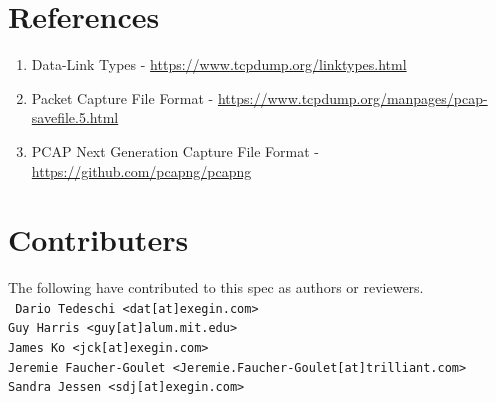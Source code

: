 \documentclass[12pt]{article}
\renewcommand\_{\textunderscore\allowbreak}
\begin{document}
\section{References}\label{sec:references}
    \begin{enumerate}
        \item Data-Link Types - \url{https://www.tcpdump.org/linktypes.html}\label{itm:linktypes}
        \item Packet Capture File Format - \url{https://www.tcpdump.org/manpages/pcap-savefile.5.html}\label{itm:libpcap}
        \item PCAP Next Generation Capture File Format - \url{https://github.com/pcapng/pcapng}\label{itm:pcapng}
    \end{enumerate}

\section{Contributers}\label{sec:references}
The following have contributed to this spec as authors or reviewers.\\
\tt{
Dario Tedeschi <dat[at]exegin.com>\\
Guy Harris <guy[at]alum.mit.edu>\\
James Ko <jck[at]exegin.com>\\
Jeremie Faucher-Goulet <Jeremie.Faucher-Goulet[at]trilliant.com>\\
Sandra Jessen <sdj[at]exegin.com>\\
}
\end{document}
